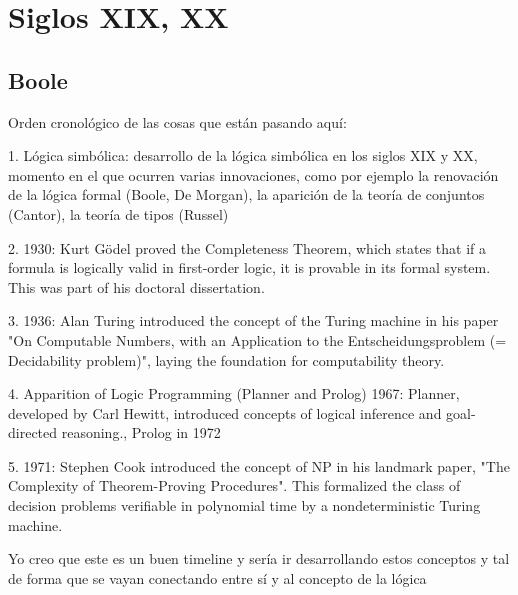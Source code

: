 \documentclass{article}
\begin{document}
\section{Siglos XIX, XX}

\subsection{Boole}

Orden cronológico de las cosas que están pasando aquí:

1. Lógica simbólica: desarrollo de la
lógica simbólica en los siglos XIX y XX, momento en el que ocurren varias
innovaciones, como por ejemplo la renovación de la lógica formal (Boole, De
Morgan), la aparición de la teoría de conjuntos (Cantor), la teoría de tipos
(Russel)

2. 1930: Kurt Gödel proved the Completeness Theorem, which states that if a formula is logically valid in first-order logic, it is provable in its formal system. This was part of his doctoral dissertation.

3. 1936: Alan Turing introduced the concept of the Turing machine in his paper "On Computable Numbers, with an Application to the Entscheidungsproblem (= Decidability problem)", laying the foundation for computability theory.

4. Apparition of Logic Programming (Planner and Prolog) 
1967: Planner, developed by Carl Hewitt, introduced concepts of logical inference and goal-directed reasoning., Prolog in 1972

5. 1971: Stephen Cook introduced the concept of NP in his landmark paper, "The Complexity of Theorem-Proving Procedures". This formalized the class of decision problems verifiable in polynomial time by a nondeterministic Turing machine.

Yo creo que este es un buen timeline y sería ir desarrollando estos conceptos y tal de forma que se vayan conectando entre sí y al concepto de la lógica




\renewcommand{\refname}{Referencias}


\end{document}
